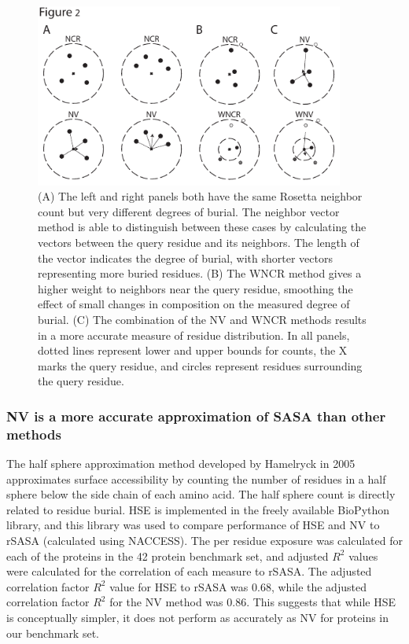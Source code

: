 \begin{figure}
\centering
\includegraphics[width=4in]{figures/nv_kbp/nv_schematic}
\caption{
(A) The left and right panels both have the same Rosetta neighbor count \citep{Dantas:2003vt} but very different degrees of burial.
The neighbor vector method is able to distinguish between these cases by calculating the vectors between the query residue and its neighbors.
The length of the vector indicates the degree of burial, with shorter vectors representing more buried residues. 
(B) The \acf{WNCR} method gives a higher weight to neighbors near the query residue, smoothing the effect of small changes in composition on the measured degree of burial. 
(C) The combination of the \acs{NV} and \acs{WNCR} methods results in a more accurate measure of residue distribution. 
In all panels, dotted lines represent lower and upper bounds for counts, the X marks the query residue, and circles represent residues surrounding the query residue.
}
\label{fig:nv_schematic}
\end{figure}

\subsubsection{\acs{NV} is a more accurate approximation of \acs{SASA} than other methods} 
The half sphere approximation method developed by Hamelryck in 2005 \citep{Hamelryck:2005kt} approximates surface accessibility by counting the number of residues in a half sphere below the side chain of each amino acid.
The half sphere count is directly related to residue burial.
\ac{HSE} is implemented in the freely available BioPython library, and this library was used to compare performance of \ac{HSE} and \ac{NV} to \ac{rSASA} (calculated using NACCESS).
The per residue exposure was calculated for each of the proteins in the 42 protein benchmark set, and adjusted $R^{2}$ values were calculated for the correlation of each measure to \ac{rSASA}.
The adjusted correlation factor $R^{2}$ value for \ac{HSE} to \ac{rSASA} was 0.68, while the adjusted correlation factor $R^{2}$ for the \ac{NV} method was 0.86.
This suggests that while \ac{HSE} is conceptually simpler, it does not perform as accurately as \ac{NV} for proteins in our benchmark set.

